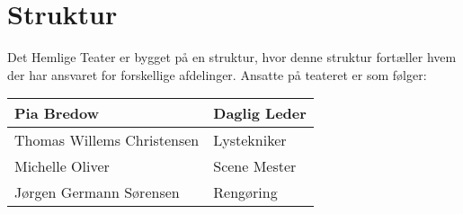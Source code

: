 \section*{Struktur}
Det Hemlige Teater er bygget på en struktur, hvor denne struktur fortæller hvem der har ansvaret for forskellige afdelinger. Ansatte på teateret er som følger:
\begin{center}
  \begin{tabular}{ l l }
    Pia Bredow  &  Daglig Leder\\
    \hline
    Thomas Willems Christensen & Lystekniker\\
    \hline
    Michelle Oliver & Scene Mester\\
    \hline
    Jørgen Germann Sørensen & Rengøring\\
    \hline
  \end{tabular}
\end{center}
